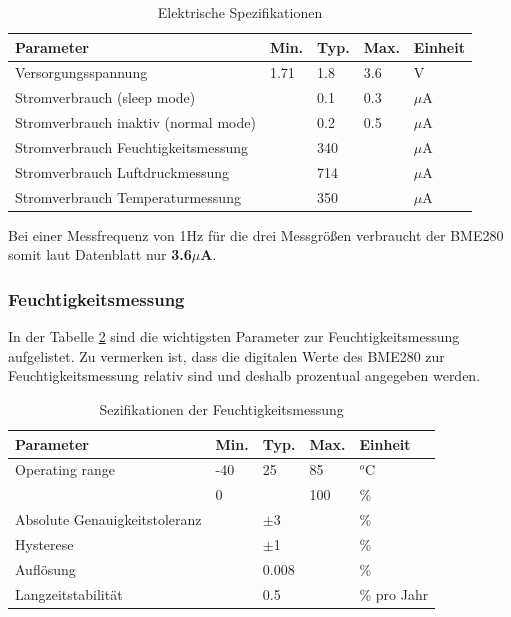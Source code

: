 \begin{table}[h]
  \centering
  \caption{Elektrische Spezifikationen \cite{Bosch2019}}
    \begin{tabular}{lllll}
    \toprule
    \textbf{Parameter} & \textbf{Min.} & \textbf{Typ.} & \textbf{Max.} & \textbf{Einheit} \\
    \midrule
    Versorgungsspannung & 1.71  & 1.8   & 3.6   & V \\
    Stromverbrauch (sleep mode) &       & 0.1   & 0.3   & $\mu$A \\
    Stromverbrauch inaktiv (normal mode) &       & 0.2   & 0.5   & $\mu$A \\
    Stromverbrauch Feuchtigkeitsmessung &       & 340   &       & $\mu$A \\
    Stromverbrauch Luftdruckmessung &       & 714   &       & $\mu$A \\
    Stromverbrauch Temperaturmessung &       & 350   &       & $\mu$A \\
    \bottomrule
    \end{tabular}%
  \label{tab:elektrische_Spezifikationen}%
\end{table}%

Bei einer Messfrequenz von 1Hz für die drei Messgrößen verbraucht der BME280 somit laut Datenblatt nur \textbf{3.6$\mu$A}. \cite[S. 2]{Bosch2019}

\subsubsection*{\textbf{Feuchtigkeitsmessung}}
In der Tabelle \ref{tab:spez_feuchtigkeit} sind die wichtigsten Parameter zur Feuchtigkeitsmessung aufgelistet. Zu vermerken ist, dass die digitalen Werte des BME280 zur Feuchtigkeitsmessung relativ sind und deshalb prozentual angegeben werden. \\
\begin{table}[htbp]
  \centering
  \caption{Sezifikationen der Feuchtigkeitsmessung \cite{Bosch2019}}
    \begin{tabular}{lllll}
    \toprule
     \textbf{Parameter} & \textbf{Min.} & \textbf{Typ.} & \textbf{Max.} & \textbf{Einheit} \\
    \midrule
    Operating range & -40   & 25    & 85    & $^{o}$C \\
          & 0     &       & 100   & \% \\
    Absolute Genauigkeitstoleranz &       & $\pm$3 &       & \% \\
    Hysterese &       & $\pm$1 &       & \% \\
    Auflösung &       & 0.008 &       & \% \\
    Langzeitstabilität &       & 0.5   &       & \% pro Jahr \\
    \bottomrule
    \end{tabular}%
  \label{tab:spez_feuchtigkeit}%
\end{table}%

